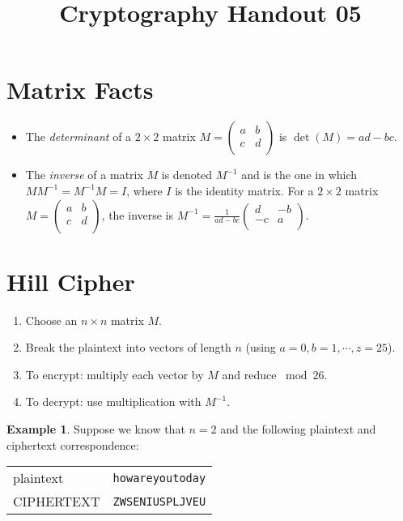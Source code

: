 \documentclass[12pt]{amsart}
\makeatletter
\def\subtitle#1{\gdef\@subtitle{#1}}
\def\@subtitle{}
\theoremstyle{plain}
\theoremstyle{definition}
\newtheorem*{ex}{Example}
\theoremstyle{remark}
\newcommand{\bex}{\begin{ex}}
\newcommand{\eex}{\end{ex}}
\makeatother
\begin{document}
\onehalfspacing

\title[]{Cryptography Handout 05}
\subtitle{Block Ciphers}
\maketitle

\section{Matrix Facts}
\begin{itemize}
	\item The \textit{determinant} of a $2 \times 2$ matrix $M = \left( \begin{array}{rr}
	a&b\\c&d\\
	\end{array} \right)$ is $\det(M) = ad-bc$.
	\item The \textit{inverse} of a matrix $M$ is denoted $M^{-1}$ and is the one in which $MM^{-1} = M^{-1}M = I$, where $I$ is the identity matrix.  For a $2 \times 2$ matrix $M = \left( \begin{array}{rr}
	a&b\\c&d\\
	\end{array} \right)$, the inverse is
	$M^{-1} = \displaystyle \frac{1}{ad-bc}\left( \begin{array}{rr}
	d&-b\\-c&a\\
	\end{array} \right)$.
\end{itemize}

\vspace{.5in}

\section{Hill Cipher}
\begin{enumerate}[1.]
	\item Choose an $n \times n$ matrix $M$.
	\item Break the plaintext into vectors of length $n$ (using $a = 0, b = 1, \cdots, z = 25$).
	\item To encrypt: multiply each vector by $M$ and reduce $\bmod 26$.
	\item To decrypt: use multiplication with $M^{-1}$.
\end{enumerate}

\bex Suppose we know that $n = 2$ and the following plaintext and ciphertext correspondence:\\
\begin{center}
\begin{tabular}{ll}
plaintext & \texttt{howareyoutoday}\\
CIPHERTEXT & \texttt{ZWSENIUSPLJVEU}\\
\end{tabular}
\end{center}
\eex
\end{document}

